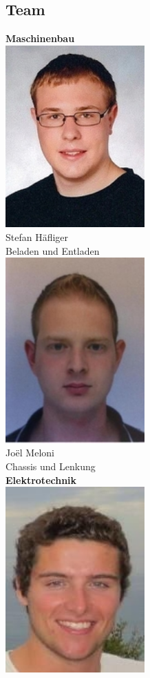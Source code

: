 \subsection{Team}

\begin{minipage}{0.49\textwidth}
\begin{flushleft} \large
\textbf{Maschinenbau}\\[2ex]
\includegraphics[width=0.4\textwidth]{./04_Projektmanagement/fig/stefanhaefliger.jpg}\\
Stefan Häfliger\\
Beladen und Entladen\\[2ex]
\includegraphics[width=0.4\textwidth]{./04_Projektmanagement/fig/joelmeloni.jpg}\\
Joël Meloni\\
Chassis und Lenkung\\[2ex]
\textbf{Elektrotechnik}\\[2ex]
\includegraphics[width=0.4\textwidth]{./04_Projektmanagement/fig/silvanritz.jpg}\\

\end{flushleft}
\end{minipage}
